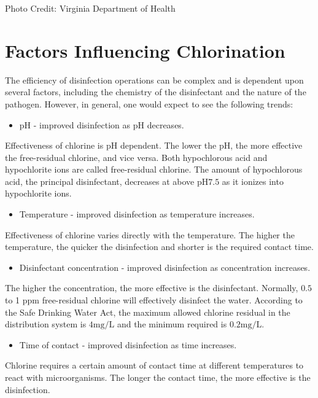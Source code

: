 \documentclass[10pt]{article}
\begin{document}
Photo Credit: Virginia Department of Health

\section{Factors Influencing Chlorination}
The efficiency of disinfection operations can be complex and is dependent upon several factors, including the chemistry of the disinfectant and the nature of the pathogen. However, in general, one would expect to see the following trends:

\begin{itemize}
  \item $\mathrm{pH}$ - improved disinfection as $\mathrm{pH}$ decreases.
\end{itemize}
Effectiveness of chlorine is $\mathrm{pH}$ dependent. The lower the $\mathrm{pH}$, the more effective the free-residual chlorine, and vice versa. Both hypochlorous acid and hypochlorite ions are called free-residual chlorine. The amount of hypochlorous acid, the principal disinfectant, decreases at above $\mathrm{pH} 7.5$ as it ionizes into hypochlorite ions.

\begin{itemize}
  \item Temperature - improved disinfection as temperature increases.
\end{itemize}
Effectiveness of chlorine varies directly with the temperature. The higher the temperature, the quicker the disinfection and shorter is the required contact time.

\begin{itemize}
  \item Disinfectant concentration - improved disinfection as concentration increases.
\end{itemize}
The higher the concentration, the more effective is the disinfectant. Normally, $0.5$ to 1 ppm free-residual chlorine will effectively disinfect the water. According to the Safe Drinking Water Act, the maximum allowed chlorine residual in the distribution system is $4 \mathrm{mg} / \mathrm{L}$ and the minimum required is $0.2 \mathrm{mg} / \mathrm{L}$.

\begin{itemize}
  \item Time of contact - improved disinfection as time increases.
\end{itemize}
Chlorine requires a certain amount of contact time at different temperatures to react with microorganisms. The longer the contact time, the more effective is the disinfection.
\end{document}
